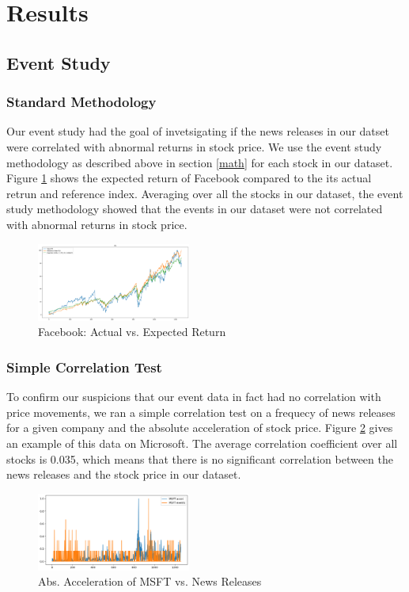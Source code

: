 \documentclass[conference]{IEEEtran}
\begin{document}
\section{Results}
\subsection{Event Study}
\subsubsection{Standard Methodology}
Our event study had the goal of invetsigating if the news releases in our datset were correlated with abnormal returns in stock price. We use the event study methodology as described above in section \ref{math} for each stock in our dataset. Figure \ref{fig:expected} shows the expected return of Facebook compared to the its actual retrun and reference index. Averaging over all the stocks in our dataset, the event study methodology showed that the events in our dataset were not correlated with abnormal returns in stock price.
\begin{figure}[ht]
	\centering
	\includegraphics[width=0.45\textwidth]{FBExpectedValues.png}
	\caption{Facebook: Actual vs. Expected Return}
	\label{fig:expected}
\end{figure} 
\subsubsection{Simple Correlation Test}
To confirm our suspicions that our event data in fact had no correlation with price movements, we ran a simple correlation test on a frequecy of news releases for a given company and the absolute acceleration of stock price. Figure \ref{fig:acceleartion} gives an example of this data on Microsoft. The average correlation coefficient over all stocks is 0.035, which means that there is no significant correlation between the news releases and the stock price in our dataset.
\begin{figure}[ht]
	\centering
	\includegraphics[width=0.45\textwidth]{MSFTevents.png}
	\caption{Abs. Acceleration of MSFT vs. News Releases}
	\label{fig:acceleartion}
\end{figure}
\end{document}
